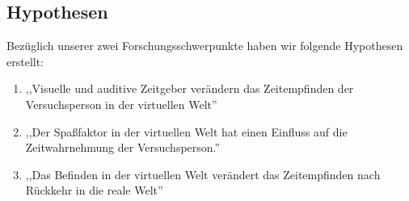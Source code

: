 \documentclass{Paper}
\begin{document}
\subsection{Hypothesen}

Bezüglich unserer zwei Forschungsschwerpunkte haben wir folgende Hypothesen erstellt:
\begin{enumerate}
\item ,,Visuelle und auditive Zeitgeber verändern das Zeitempfinden der Versuchsperson in der virtuellen Welt''

\item ,,Der Spaßfaktor in der virtuellen Welt hat einen Einfluss auf die Zeitwahrnehmung der Versuchsperson.''



\item ,,Das Befinden in der virtuellen Welt verändert das Zeitempfinden nach Rückkehr in die reale Welt''

\end{enumerate}


\end{document}
